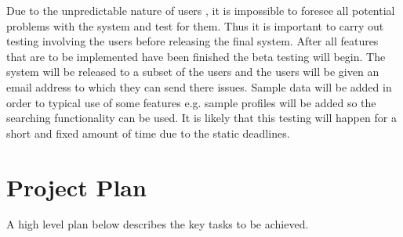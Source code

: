 \documentclass[a4paper,oneside,11pt]{report}
\begin{document}
Due to the unpredictable nature of users , it is impossible to foresee all potential problems with the system and test for them. Thus it is important to carry out testing involving the users before releasing  the final system. After all features that are to be implemented have been finished the beta testing will begin. The system will be released to a subset of the users and the users will be given an email address to which they can send there issues. Sample data will be added in order to typical use of some features e.g. sample profiles will be added so the searching functionality can be used. It is likely that this testing will happen for a short and fixed amount of time due to the static deadlines.
\chapter{Project Plan}
A high level plan below describes the key tasks to be achieved.
\end{document}
